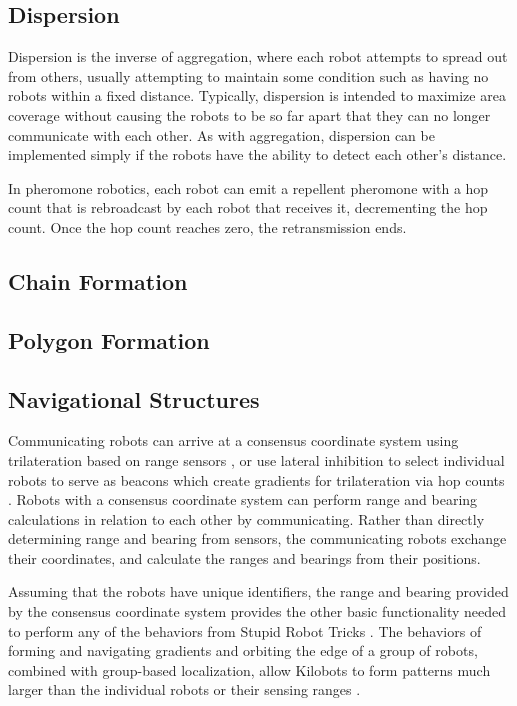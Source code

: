 \documentclass[]{article}
\begin{document}
\subsection{Dispersion}

Dispersion is the inverse of aggregation, where each robot attempts to spread out from others, usually attempting to maintain some condition such as having no robots within a fixed distance. 
Typically, dispersion is intended to maximize area coverage without causing the robots to be so far apart that they can no longer communicate with each other. 
As with aggregation, dispersion can be implemented simply if the robots have the ability to detect each other's distance. 

In pheromone robotics, each robot can emit a repellent pheromone with a hop count that is rebroadcast by each robot that receives it, decrementing the hop count. 
Once the hop count reaches zero, the retransmission ends. 


\subsection{Chain Formation}

\subsection{Polygon Formation}

\subsection{Navigational Structures} \label{pheremone_nav_struct}

Communicating robots can arrive at a consensus coordinate system using trilateration based on range sensors \cite{cheng2005robust}, or use lateral inhibition to select individual robots to serve as beacons which create gradients for trilateration via hop counts \cite{nagpal1999organizing}.
Robots with a consensus coordinate system can perform range and bearing calculations in relation to each other by communicating.
Rather than directly determining range and bearing from sensors, the communicating robots exchange their coordinates, and calculate the ranges and bearings from their positions. 

Assuming that the robots have unique identifiers, the range and bearing provided by the consensus coordinate system provides the other basic functionality needed to perform any of the behaviors from Stupid Robot Tricks \cite{mclurkin2004stupid}.
The behaviors of forming and navigating gradients and orbiting the edge of a group of robots, combined with group-based localization, allow Kilobots to form patterns much larger than the individual robots or their sensing ranges \cite{Rubenstein795}.
\end{document}
